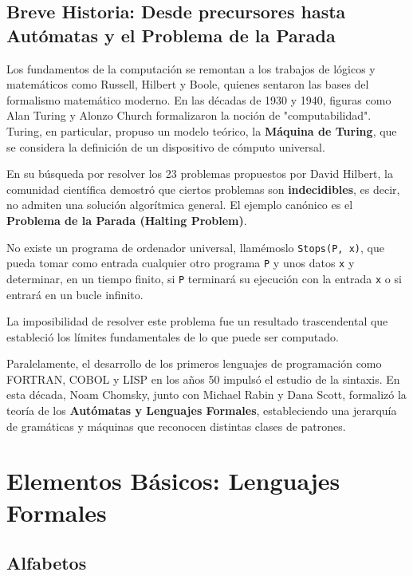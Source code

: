 \subsection{Breve Historia: Desde precursores hasta Autómatas y el Problema de la Parada}

Los fundamentos de la computación se remontan a los trabajos de lógicos y matemáticos como Russell, Hilbert y Boole, quienes sentaron las bases del formalismo matemático moderno. En las décadas de 1930 y 1940, figuras como Alan Turing y Alonzo Church formalizaron la noción de "computabilidad". Turing, en particular, propuso un modelo teórico, la \textbf{Máquina de Turing}, que se considera la definición de un dispositivo de cómputo universal.

En su búsqueda por resolver los 23 problemas propuestos por David Hilbert, la comunidad científica demostró que ciertos problemas son \textbf{indecidibles}, es decir, no admiten una solución algorítmica general. El ejemplo canónico es el \textbf{Problema de la Parada (Halting Problem)}.

\begin{definicion}
    No existe un programa de ordenador universal, llamémoslo \texttt{Stops(P, x)}, que pueda tomar como entrada cualquier otro programa \texttt{P} y unos datos \texttt{x} y determinar, en un tiempo finito, si \texttt{P} terminará su ejecución con la entrada \texttt{x} o si entrará en un bucle infinito.
\end{definicion}

La imposibilidad de resolver este problema fue un resultado trascendental que estableció los límites fundamentales de lo que puede ser computado.

Paralelamente, el desarrollo de los primeros lenguajes de programación como FORTRAN, COBOL y LISP en los años 50 impulsó el estudio de la sintaxis. En esta década, Noam Chomsky, junto con Michael Rabin y Dana Scott, formalizó la teoría de los \textbf{Autómatas y Lenguajes Formales}, estableciendo una jerarquía de gramáticas y máquinas que reconocen distintas clases de patrones.

\section{Elementos Básicos: Lenguajes Formales}

\subsection{Alfabetos}


